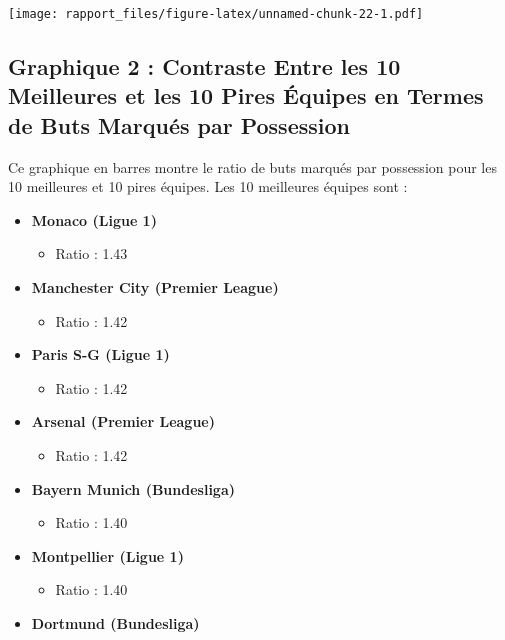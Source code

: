 \documentclass[
]{article}
\providecommand{\tightlist}{%
  \setlength{\itemsep}{0pt}\setlength{\parskip}{0pt}}
\begin{document}
\texttt{[image: rapport\_files/figure-latex/unnamed-chunk-22-1.pdf]}

\subsection{Graphique 2 : Contraste Entre les 10 Meilleures et les 10
Pires Équipes en Termes de Buts Marqués par
Possession}\label{graphique-2-contraste-entre-les-10-meilleures-et-les-10-pires-uxe9quipes-en-termes-de-buts-marquuxe9s-par-possession}

Ce graphique en barres montre le ratio de buts marqués par possession
pour les 10 meilleures et 10 pires équipes. Les 10 meilleures équipes
sont :

\begin{itemize}
\tightlist
\item
  \textbf{Monaco (Ligue 1)}

  \begin{itemize}
  \tightlist
  \item
    Ratio : 1.43
  \end{itemize}
\item
  \textbf{Manchester City (Premier League)}

  \begin{itemize}
  \tightlist
  \item
    Ratio : 1.42
  \end{itemize}
\item
  \textbf{Paris S-G (Ligue 1)}

  \begin{itemize}
  \tightlist
  \item
    Ratio : 1.42
  \end{itemize}
\item
  \textbf{Arsenal (Premier League)}

  \begin{itemize}
  \tightlist
  \item
    Ratio : 1.42
  \end{itemize}
\item
  \textbf{Bayern Munich (Bundesliga)}

  \begin{itemize}
  \tightlist
  \item
    Ratio : 1.40
  \end{itemize}
\item
  \textbf{Montpellier (Ligue 1)}

  \begin{itemize}
  \tightlist
  \item
    Ratio : 1.40
  \end{itemize}
\item
  \textbf{Dortmund (Bundesliga)}


\end{itemize}
\end{document}
